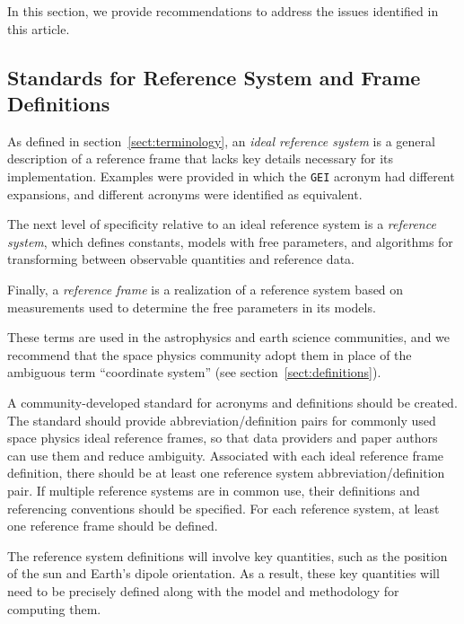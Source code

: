\documentclass[draft]{agujournal2019}
\begin{document}

In this section, we provide recommendations to address the issues identified in this article.

\subsection{Standards for Reference System and Frame Definitions}
\label{sect:standard-for}

As defined in section~\ref {sect:terminology}, an {\it ideal reference system} is a general description of a reference frame that lacks key details necessary for its implementation. Examples were provided in which the \texttt{GEI} acronym had different expansions, and different acronyms were identified as equivalent.
  
The next level of specificity relative to an ideal reference system is a {\it reference system}, which defines constants, models with free parameters, and algorithms for transforming between observable quantities and reference data. 

Finally, a {\it reference frame} is a realization of a reference system based on measurements used to determine the free parameters in its models. 

These terms are used in the astrophysics and earth science communities, and we recommend that the space physics community adopt them in place of the ambiguous term ``coordinate system'' (see section~\ref{sect:definitions}).

A community-developed standard for acronyms and definitions should be created. The standard should provide abbreviation/definition pairs for commonly used space physics ideal reference frames, so that data providers and paper authors can use them and reduce ambiguity. Associated with each ideal reference frame definition, there should be at least one reference system abbreviation/definition pair. If multiple reference systems are in common use, their definitions and referencing conventions should be specified. For each reference system, at least one reference frame should be defined.

The reference system definitions will involve key quantities, such as the position of the sun and Earth's dipole orientation. As a result, these key quantities will need to be precisely defined along with the model and methodology for computing them. 

\end{document}
